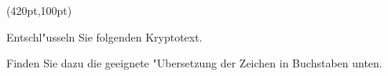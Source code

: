 

\PapierGroesse(420pt,100pt)


\parskip=2pt

Entschl"usseln Sie folgenden Kryptotext. 

Finden Sie dazu die geeignete "Ubersetzung der Zeichen in Buchstaben unten.

